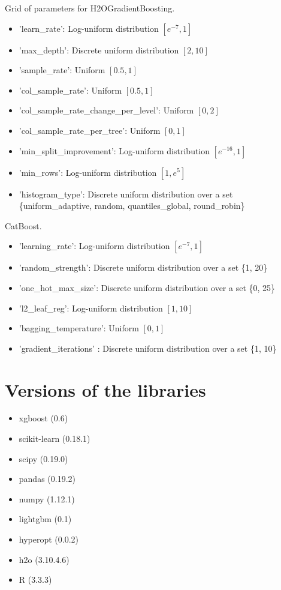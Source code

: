 \documentclass{article}
\begin{document}
\medskip
\noindent Grid of parameters for H2OGradientBoosting.
\medskip 
\begin{itemize}
  \item 'learn\_rate': Log-uniform distribution $[e^{-7}, 1]$
  \item 'max\_depth': Discrete uniform distribution $[2, 10]$
  \item 'sample\_rate': Uniform $[0.5, 1]$
  \item 'col\_sample\_rate': Uniform $[0.5, 1]$
  \item 'col\_sample\_rate\_change\_per\_level': Uniform $[0, 2]$
  \item 'col\_sample\_rate\_per\_tree': Uniform $[0, 1]$
  \item 'min\_split\_improvement': Log-uniform distribution $[e^{-16}, 1]$
  \item 'min\_rows': Log-uniform distribution $[1, e^{5}]$
  \item 'histogram\_type': Discrete uniform distribution over a set \{uniform\_adaptive, random, quantiles\_global, round\_robin\}
\end{itemize}

\medskip
\noindent CatBoost.
\begin{itemize}
  \item 'learning\_rate':  Log-uniform distribution $[e^{-7}, 1]$
  \item 'random\_strength': Discrete uniform distribution over a set  \{1, 20\}
  \item 'one\_hot\_max\_size': Discrete uniform distribution over a set  \{0, 25\}
  \item 'l2\_leaf\_reg': Log-uniform distribution $[1, 10]$
  \item 'bagging\_temperature': Uniform $[0, 1]$
  \item 'gradient\_iterations' : Discrete uniform distribution over a set  \{1, 10\}
\end{itemize}


\section{Versions of the libraries}

\begin{itemize}
  \item xgboost (0.6)
  \item scikit-learn (0.18.1)
  \item scipy (0.19.0)
  \item pandas (0.19.2)
  \item numpy (1.12.1)
  \item lightgbm (0.1)
  \item hyperopt (0.0.2)
  \item h2o (3.10.4.6)
  \item R (3.3.3)
\end{itemize}
\end{document}
